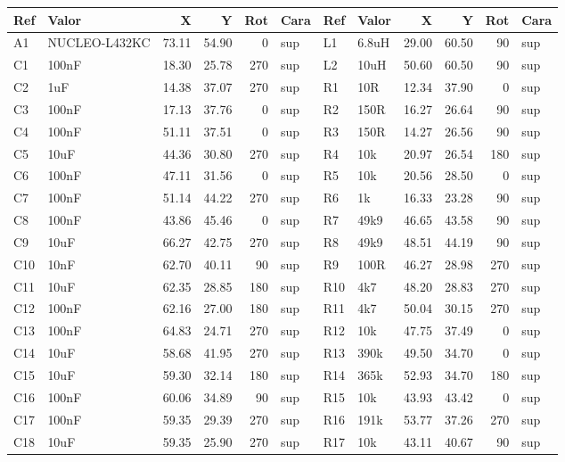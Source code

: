 \documentclass[10pt,a4paper]{article}
\begin{document}
{\footnotesize\begin{longtable}{@{}llrrrl|llrrrl@{}}\toprule
\textbf{Ref} & \textbf{Valor} & \textbf{X} & \textbf{Y} & \textbf{Rot} & \textbf{Cara} & \textbf{Ref} & \textbf{Valor} & \textbf{X} & \textbf{Y} & \textbf{Rot} & \textbf{Cara}\\\midrule\endhead
A1 & NUCLEO-L432KC & 73.11 & 54.90 & 0 & sup & L1 & 6.8uH & 29.00 & 60.50 & 90 & sup\\
C1 & 100nF & 18.30 & 25.78 & 270 & sup & L2 & 10uH & 50.60 & 60.50 & 90 & sup\\
C2 & 1uF & 14.38 & 37.07 & 270 & sup & R1 & 10R & 12.34 & 37.90 & 0 & sup\\
C3 & 100nF & 17.13 & 37.76 & 0 & sup & R2 & 150R & 16.27 & 26.64 & 90 & sup\\
C4 & 100nF & 51.11 & 37.51 & 0 & sup & R3 & 150R & 14.27 & 26.56 & 90 & sup\\
C5 & 10uF & 44.36 & 30.80 & 270 & sup & R4 & 10k & 20.97 & 26.54 & 180 & sup\\
C6 & 100nF & 47.11 & 31.56 & 0 & sup & R5 & 10k & 20.56 & 28.50 & 0 & sup\\
C7 & 100nF & 51.14 & 44.22 & 270 & sup & R6 & 1k & 16.33 & 23.28 & 90 & sup\\
C8 & 100nF & 43.86 & 45.46 & 0 & sup & R7 & 49k9 & 46.65 & 43.58 & 90 & sup\\
C9 & 10uF & 66.27 & 42.75 & 270 & sup & R8 & 49k9 & 48.51 & 44.19 & 90 & sup\\
C10 & 10nF & 62.70 & 40.11 & 90 & sup & R9 & 100R & 46.27 & 28.98 & 270 & sup\\
C11 & 10uF & 62.35 & 28.85 & 180 & sup & R10 & 4k7 & 48.20 & 28.83 & 270 & sup\\
C12 & 100nF & 62.16 & 27.00 & 180 & sup & R11 & 4k7 & 50.04 & 30.15 & 270 & sup\\
C13 & 100nF & 64.83 & 24.71 & 270 & sup & R12 & 10k & 47.75 & 37.49 & 0 & sup\\
C14 & 10uF & 58.68 & 41.95 & 270 & sup & R13 & 390k & 49.50 & 34.70 & 0 & sup\\
C15 & 10uF & 59.30 & 32.14 & 180 & sup & R14 & 365k & 52.93 & 34.70 & 180 & sup\\
C16 & 100nF & 60.06 & 34.89 & 90 & sup & R15 & 10k & 43.93 & 43.42 & 0 & sup\\
C17 & 100nF & 59.35 & 29.39 & 270 & sup & R16 & 191k & 53.77 & 37.26 & 270 & sup\\
C18 & 10uF & 59.35 & 25.90 & 270 & sup & R17 & 10k & 43.11 & 40.67 & 90 & sup\\

\end{longtable}}
\end{document}
